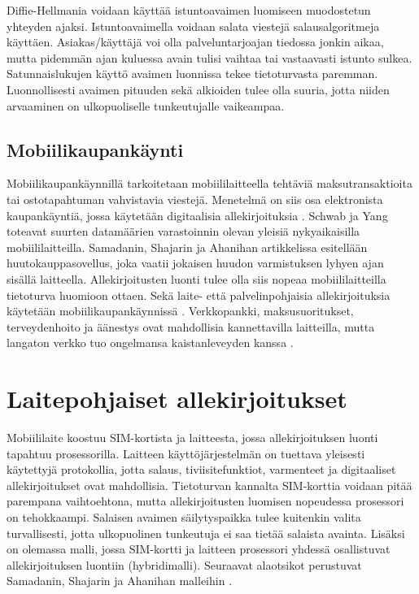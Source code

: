 \documentclass[finnish]{tktltiki2}
\theoremstyle{definition}
\theoremstyle{remark}
\begin{document}
Diffie-Hellmania voidaan käyttää istuntoavaimen luomiseen muodostetun yhteyden ajaksi. Istuntoavaimella voidaan salata viestejä salausalgoritmeja käyttäen.  Asiakas/käyttäjä voi olla palveluntarjoajan tiedossa jonkin aikaa, mutta pidemmän ajan kuluessa avain tulisi vaihtaa tai vastaavasti istunto sulkea. Satunnaislukujen käyttö avaimen luonnissa tekee tietoturvasta paremman. Luonnollisesti avaimen pituuden sekä alkioiden tulee olla suuria, jotta niiden arvaaminen on ulkopuoliselle tunkeutujalle vaikeampaa. \cite{enti} 


\subsection{Mobiilikaupankäynti}

Mobiilikaupankäynnillä tarkoitetaan mobiililaitteella tehtäviä maksutransaktioita tai ostotapahtuman vahvistavia viestejä. Menetelmä on siis osa elektronista kaupankäyntiä, jossa käytetään digitaalisia allekirjoituksia \cite{e-c}. Schwab ja Yang toteavat  \cite{enti} suurten datamäärien varastoinnin olevan yleisiä nykyaikaisilla mobiililaitteilla. Samadanin, Shajarin ja Ahanihan artikkelissa \cite{proxy} esitellään huutokauppasovellus, joka vaatii jokaisen huudon varmistuksen lyhyen ajan sisällä laitteella. Allekirjoitusten luonti tulee olla siis nopeaa mobiililaitteilla tietoturva huomioon ottaen. Sekä laite- että palvelinpohjaisia allekirjoituksia käytetään mobiilikaupankäynnissä \cite{proxy}. Verkkopankki, maksusuoritukset, terveydenhoito ja äänestys ovat mahdollisia kannettavilla laitteilla, mutta langaton verkko tuo ongelmansa kaistanleveyden kanssa \cite{ECC}. 



\section{Laitepohjaiset allekirjoitukset}

Mobiililaite koostuu SIM-kortista ja laitteesta, jossa allekirjoituksen luonti tapahtuu prosessorilla. Laitteen käyttöjärjestelmän on tuettava yleisesti käytettyjä protokollia, jotta salaus, tiviisitefunktiot, varmenteet ja digitaaliset allekirjoitukset ovat mahdollisia. Tietoturvan kannalta SIM-korttia voidaan pitää parempana vaihtoehtona, mutta allekirjoitusten luomisen nopeudessa prosessori on tehokkaampi. Salaisen avaimen säilytyspaikka tulee kuitenkin valita turvallisesti, jotta ulkopuolinen tunkeutuja ei saa tietää salaista avainta. Lisäksi on olemassa malli, jossa SIM-kortti ja laitteen prosessori yhdessä osallistuvat allekirjoituksen luontiin (hybridimalli). Seuraavat alaotsikot perustuvat Samadanin, Shajarin ja Ahanihan malleihin \cite{proxy}. 
 
\end{document}
